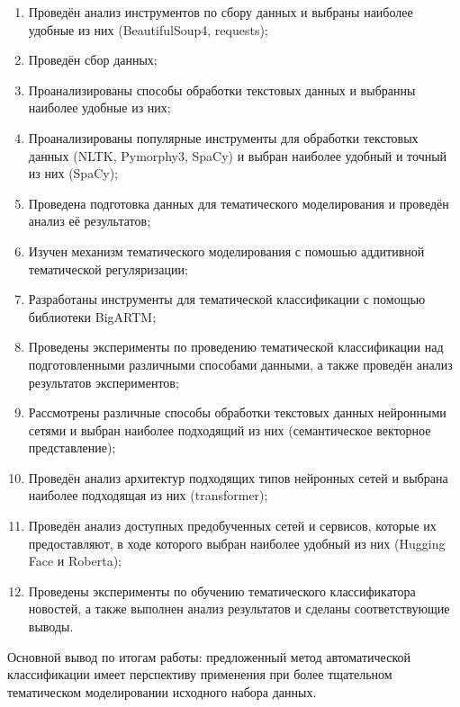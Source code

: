 \documentclass[autoref]{SCWorks}
\begin{document}
\begin{enumerate}
    \item Проведён анализ инструментов по сбору данных и выбраны
    наиболее удобные из них (BeautifulSoup4, requests);
    \item Проведён сбор данных;
    \item Проанализированы способы обработки текстовых данных
    и выбранны наиболее удобные из них;
    \item Проанализированы популярные инструменты для обработки
    текстовых данных (NLTK, Pymorphy3, SpaCy) и выбран наиболее
    удобный и точный из них (SpaCy);
    \item Проведена подготовка данных для тематического моделирования и
    проведён анализ её результатов;
    \item Изучен механизм тематического моделирования с помошью
    аддитивной тематической регуляризации;
    \item Разработаны инструменты для тематической классификации с
    помощью библиотеки BigARTM;
    \item Проведены эксперименты по проведению тематической классификации
    над подготовленными различными способами данными, а также
    проведён анализ результатов экспериментов;
    \item Рассмотрены различные способы обработки текстовых данных нейронными
    сетями и выбран наиболее подходящий из них (семантическое векторное
    представление);
    \item Проведён анализ архитектур подходящих типов нейронных сетей
    и выбрана наиболее подходящая из них (transformer);
    \item Проведён анализ доступных предобученных сетей и сервисов, которые
    их предоставляют, в ходе которого выбран наиболее удобный из них (Hugging
    Face и Roberta);
    \item Проведены эксперименты по обучению тематического классификатора
    новостей, а также выполнен анализ результатов и сделаны соответствующие
    выводы.
\end{enumerate}

Основной вывод по итогам работы: предложенный метод автоматической классификации
имеет перспективу применения при более тщательном тематическом моделировании
исходного набора данных.
\end{document}

